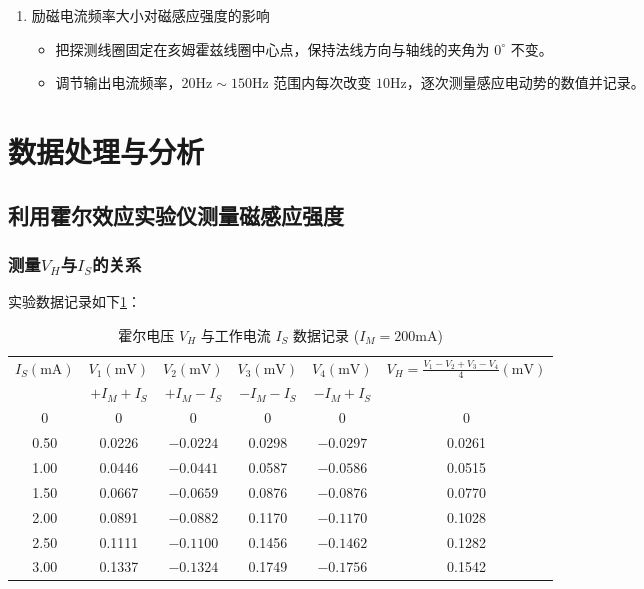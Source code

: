\documentclass[11pt]{article}
\begin{document}
\begin{enumerate}
    \item 励磁电流频率大小对磁感应强度的影响
    \begin{itemize}
        \item 把探测线圈固定在亥姆霍兹线圈中心点，保持法线方向与轴线的夹角为 $0^\circ$ 不变。
        \item 调节输出电流频率，$20\text{Hz} \sim 150\text{Hz}$ 范围内每次改变 $10\text{Hz}$，逐次测量感应电动势的数值并记录。
    \end{itemize}
\end{enumerate}

\section{数据处理与分析}
\subsection{利用霍尔效应实验仪测量磁感应强度}
\subsubsection{测量$V_H$与$I_S$的关系}
实验数据记录如下\ref{tab:hall_effect_data}：
 \begin{table}[htbp]
    \centering
    \caption{霍尔电压 $V_H$ 与工作电流 $I_S$ 数据记录 ($I_M = 200\text{mA}$)}
    \label{tab:hall_effect_data}
    \begin{tabular}{cccccc}
        \toprule
        \multirow{2}{*}{$I_S (\text{mA})$} & $V_1 (\text{mV})$ & $V_2 (\text{mV})$ & $V_3 (\text{mV})$ & $V_4 (\text{mV})$ & \multirow{2}{*}{$V_H = \frac{V_1 - V_2 + V_3 - V_4}{4} (\text{mV})$} \\
         & $+I_M +I_S$ & $+I_M -I_S$ & $-I_M -I_S$ & $-I_M +I_S$ & \\
        \midrule
        0       & 0        & 0         & 0        & 0         & 0       \\
        0.50    & 0.0226   & $-0.0224$ & 0.0298   & $-0.0297$ & 0.0261  \\
        1.00    & 0.0446   & $-0.0441$ & 0.0587   & $-0.0586$ & 0.0515  \\
        1.50    & 0.0667   & $-0.0659$ & 0.0876   & $-0.0876$ & 0.0770  \\
        2.00    & 0.0891   & $-0.0882$ & 0.1170   & $-0.1170$ & 0.1028  \\
        2.50    & 0.1111   & $-0.1100$ & 0.1456   & $-0.1462$ & 0.1282  \\
        3.00    & 0.1337   & $-0.1324$ & 0.1749   & $-0.1756$ & 0.1542  \\
        \bottomrule
    \end{tabular}
\end{table}
\end{document}
